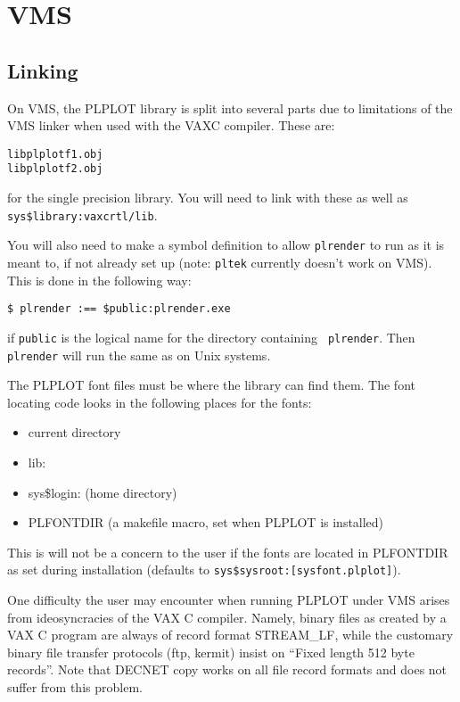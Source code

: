 \section{VMS}

\subsection{Linking}

On VMS, the PLPLOT library is split into several parts due to limitations
of the VMS linker when used with the VAXC compiler.  These are:
\begin{verbatim}
libplplotf1.obj
libplplotf2.obj
\end{verbatim}
for the single precision library.  You will need to link with these
as well as {\tt sys\$library:vaxcrtl/lib}.

You will also need to make a symbol definition to allow {\tt plrender} to
run as it is meant to, if not already set up (note: {\tt pltek} currently
doesn't work on VMS).  This is done in the following way:
\begin{verbatim}
$ plrender :== $public:plrender.exe
\end{verbatim}
if {\tt public} is the logical name for the directory containing {\tt
plrender}.  Then {\tt plrender} will run the same as on Unix systems.

The PLPLOT font files must be where the library can find them.
The font locating code looks in the following places for the fonts:
\begin{itemize}
\item	current directory
\item	lib:
\item	sys\$login:	(home directory)
\item	PLFONTDIR	(a makefile macro, set when PLPLOT is installed)
\end{itemize}
This is will not be a concern to the user if the fonts are located
in PLFONTDIR as set during installation (defaults to
{\tt sys\$sysroot:[sysfont.plplot]}). 

One difficulty the user may encounter when running PLPLOT under VMS arises
from ideosyncracies of the VAX C compiler.  Namely, binary files as created
by a VAX C program are always of record format STREAM\_LF, while the
customary binary file transfer protocols (ftp, kermit) insist on ``Fixed
length 512 byte records''.  Note that DECNET copy works on all file record
formats and does not suffer from this problem.  

